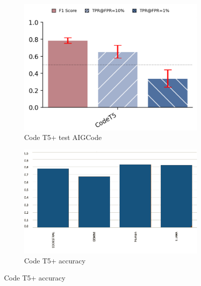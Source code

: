 \begin{figure}[H]
    \begin{subfigure}[b]{0.4\textwidth}
        \centering
        \includegraphics[width=\linewidth]{img/TEST/CodeT5/caca.png}
        \caption{Code T5+ test AIGCode}
        \label{fig:c2}
    \end{subfigure}
    \hfill
    \begin{subfigure}[t]{0.4\textwidth}
        \centering
        \includegraphics[width=\linewidth]{img/TEST/CodeT5/visualization(39).png}
        \caption{Code T5+ accuracy}
        \label{fig:cc2}
    \end{subfigure}
\end{figure}



